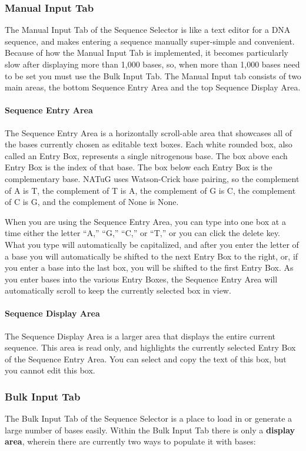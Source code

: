 \documentclass[titlepage]{article}
\begin{document}
\subsubsection{Manual Input Tab}
The Manual Input Tab of the Sequence Selector is like a text editor for a DNA sequence, and makes entering a sequence manually super-simple and convenient. Because of how the Manual Input Tab is implemented, it becomes particularly slow after displaying more than 1,000 bases, so, when more than 1,000 bases need to be set you must use the Bulk Input Tab. The Manual Input tab consists of two main areas, the bottom Sequence Entry Area and the top Sequence Display Area.

\paragraph{Sequence Entry Area}
The Sequence Entry Area is a horizontally scroll-able area that showcases all of the bases currently chosen as editable text boxes. Each white rounded box, also called an Entry Box, represents a single nitrogenous base. The box above each Entry Box is the index of that base. The box below each Entry Box is the complementary base. NATuG uses Watson-Crick base pairing, so the complement of A is T, the complement of T is A, the complement of G is C, the complement of C is G, and the complement of None is None.

When you are using the Sequence Entry Area, you can type into one box at a time either the letter ``A,'' ``G,'' ``C,'' or ``T,'' or you can click the delete key. What you type will automatically be capitalized, and after you enter the letter of a base you will automatically be shifted to the next Entry Box to the right, or, if you enter a base into the last box, you will be shifted to the first Entry Box. As you enter bases into the various Entry Boxes, the Sequence Entry Area will automatically scroll to keep the currently selected box in view.
	
\paragraph{Sequence Display Area}
The Sequence Display Area is a larger area that displays the entire current sequence. This area is read only, and highlights the currently selected Entry Box of the Sequence Entry Area. You can select and copy the text of this box, but you cannot edit this box.

\subsubsection{Bulk Input Tab}
The Bulk Input Tab of the Sequence Selector is a place to load in or generate a large number of bases easily. Within the Bulk Input Tab there is only a \textbf{display area}, wherein there are currently two  ways to populate it with bases:
\end{document}
